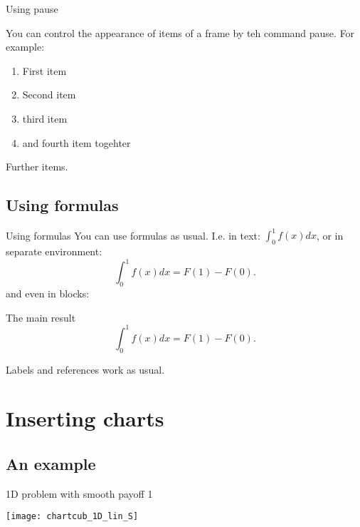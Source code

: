 \documentclass[10pt]{beamer}
\begin{document}
\begin{frame}{Using pause}

You can control the appearance of items of a frame by teh command pause. For example:
\pause
\begin{block}{}
\begin{enumerate}
\pause
\item First item
\pause
\item Second item
\pause
\item third item
\item and fourth item togehter
\end{enumerate}
\end{block}
\pause
Further items. 
\end{frame}

\subsection{Using formulas}
\begin{frame}{Using formulas}
You can use formulas as usual. I.e. in text: $\int_0^1f(x)dx$, or in separate environment:
\begin{equation}
\int_0^1f(x)dx=F(1)-F(0).
\end{equation}
\pause
and even in blocks:
\begin{block}{The main result}
\begin{equation}
\int_0^1f(x)dx=F(1)-F(0).
\end{equation}

Labels and references work as usual.
\end{block}
\end{frame}


\section{Inserting charts}
\subsection{An example}
\begin{frame}{1D problem with smooth payoff 1}
\begin{block}{}
\centering
\texttt{[image: chartcub\_1D\_lin\_S]}
\end{block}
\end{frame}
\end{document}
